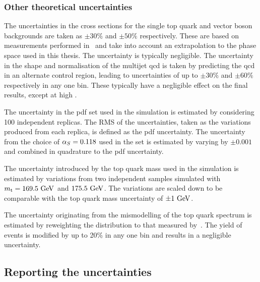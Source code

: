 
\subsubsection{Other theoretical uncertainties} %
\label{sub:other_theoretical_uncertainties}

The uncertainties in the cross sections for the single top quark and vector boson backgrounds are taken as $\pm30\%$ and $\pm50\%$ respectively.
These are based on measurements performed in~\cite{Sys:ST, Sys:W, Sys:Z} and take into account an extrapolation to the phase space used in this thesis.
The uncertainty is typically negligible.
The uncertainty in the shape and normalisation of the multijet \acrshort{qcd} is taken by predicting the \acrshort{qcd} in an alternate control region, leading to uncertainties of up to $\pm30\%$ and $\pm60\%$ respectively in any one bin.
These typically have a negligible effect on the final results, except at high \LETA{}.

The uncertainty in the \nnpdf{} \acrshort{pdf} set used in the \powhegpythia{} simulation is estimated by considering 100 independent replicas.
The RMS of the uncertainties, taken as the variations produced from each replica, is defined as the \acrshort{pdf} uncertainty.
The uncertainty from the choice of $\alpha_S = 0.118$ used in the \nnpdf{} set is estimated by varying \alpS{} by $\pm 0.001$ and combined in quadrature to the \acrshort{pdf} uncertainty.

The uncertainty introduced by the top quark mass used in the \ttbar{} simulation is estimated by variations from two independent samples simulated with $m_{\mathrm{t}} = 169.5\mathrm{~Ge\hspace{-.08em}V}^{}$ and $175.5\mathrm{~Ge\hspace{-.08em}V}^{}$.
The variations are scaled down to be comparable with the top quark mass uncertainty of $\pm1\mathrm{~Ge\hspace{-.08em}V}^{}$\cite{PDG}.

The uncertainty originating from the mismodelling of the top quark \pt{} spectrum is estimated by reweighting the \pt{} distribution to that measured by~\cite{TOP16007,TOP16008}.
The yield of \ttbar{} events is modified by up to 20\% in any one bin and results in a negligible uncertainty.

\subsection{Reporting the uncertainties} %
\label{sub:reporting_the_uncertainties}

